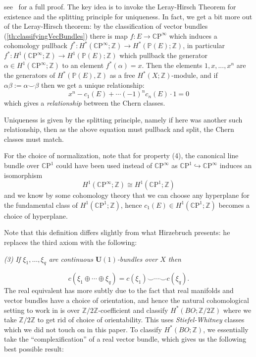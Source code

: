 \documentclass{book}
\newenvironment{Proof}[1][]
  {\begin{ProofTcb}[#1]}
  {\end{ProofTcb}}
\newcommand{\Z}{{\mathbb{Z}}}
\renewcommand{\P}{{\mathbb{P}}}
\newcommand{\CP}{{\mathbb{C}\mathrm{P}}}
\begin{document}
\begin{Proof}
  see~\cite{NateKTheory} for a full proof. The key idea is to invoke the Leray-Hirsch Theorem for existence
  and the splitting principle for uniqueness. In fact, we get a bit more out of the Leray-Hirsch theorem: by the classification of
  vector bundles (\cref{th:classifyingVecBundles}) there is map $f:E \to \CP^\infty$ which induces a
  cohomology pullback $f^*: H^*(\CP^\infty;\Z) \to H^*\left(\P(E);\Z\right)$, in particular $f^*:
  H^1(\CP^\infty;\Z) \to H^1(\P(E); \Z)$ which pullback the generator $\alpha \in H^1(\CP^\infty;\Z)$ to an
  element $f^*(\alpha) = x$. Then the elements $1, x, ..., x^n$ are the generators of $H^*(\P(E), \Z)$ as a
  free $H^*(X; \Z)$-module, and if $\alpha\beta :=\alpha\smile \beta$ then we get a unique relationship:
  \[
    x^n - c_1(E) + \cdots (-1)^n c_n(E)\cdot 1 = 0
  \]
  which gives a \emph{relationship} between the Chern classes.

  Uniqueness is given by the splitting principle, namely if here was another such relationship, then as the
  above equation must pullback and split, the Chern classes must match.
\end{Proof}

For the choice of normalization, note that for property (4), the canonical line bundle over $\CP^1$ could have
been used instead of $\CP^\infty$ as $\CP^1 \hookrightarrow \CP^\infty$ induces an isomorphism
\[
	H^1(\CP^\infty; \Z) \cong H^1(\CP^1;\Z)
\]
and we know by some cohomology theory that we can choose any hyperplane for the fundamental class of
$H^1(\CP^1;\Z)$, hence $c_1(E) \in H^1(\CP^1;\Z)$ becomes a choice of hyperplane.

Note that this definition differs slightly from what Hirzebruch presents: he replaces the third axiom with the
following:
\begin{center}
  \emph{(3) If $\xi_1, \ldots, \xi_q$ are continuous $\mathbf{U}(1)$-bundles over $X$ then}
\end{center}
\[
    c(\xi_1 \oplus \cdots \oplus \xi_q) = c(\xi_1) \smile \cdots \smile c(\xi_q).
\]
The real equivalent has more subtly due to the fact that real manifolds and vector bundles have a choice of
orientation, and hence the natural cohomological setting to work in is over $\Z/2\Z$-coefficient and classify
$H^*(BO; \Z/2\Z)$ where we take $\Z/2\Z$ to get rid of choice of orientability. This uses
\emph{Stiefel-Whitney} classes which we did not touch on in this paper. To classify $H^*(BO; \Z)$, we
essentially take the ``complexification'' of a real vector bundle, which gives us the following best possible
result:
\end{document}
